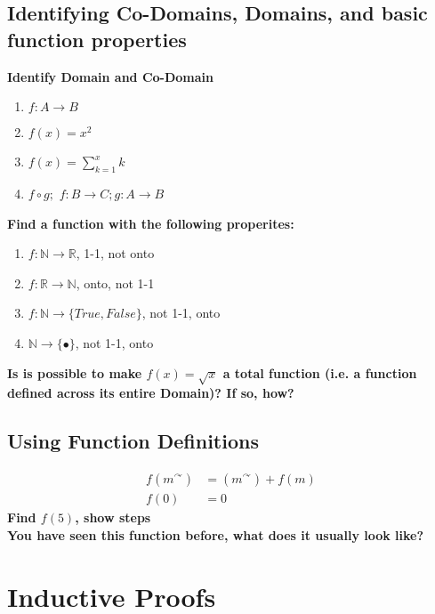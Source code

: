 \documentclass[12pt]{article}
\begin{document}
\subsection{Identifying Co-Domains, Domains, and basic \\function properties}
\textbf{Identify Domain and Co-Domain}
\begin{enumerate}
\item$f:A\to B$
\item$ f(x)=x^2$
\item$ f(x)= \sum_{k=1}^x k$
\item$ f \circ g ;$ $ f:B\to C ; g: A \to B$
\end{enumerate}
\textbf{Find a function with the following properites:}
\begin{enumerate}
\item$f:\mathbb{N}\to\mathbb{R}$, 1-1, not onto
\item$f:\mathbb{R}\to\mathbb{N}$, onto, not 1-1
\item$f:\mathbb{N}\to \{True, False\}$, not 1-1, onto
\item$\mathbb{N}\to\{\bullet\}$, not 1-1, onto
\end{enumerate}
\textbf{Is is possible to make $f(x)=\sqrt{x}$ a total function (i.e. a function defined across its entire Domain)? If so, how?}
\subsection{Using Function Definitions}
\begin{align*}
f(m^\curvearrowright)&=(m^\curvearrowright)+f(m)\\
f(0)&=0
\end{align*}
\textbf{Find $f(5)$, show steps}\\
\newline
\textbf{You have seen this function before, what does it usually look like?}
\newpage
\section{Inductive Proofs}
\end{document}
